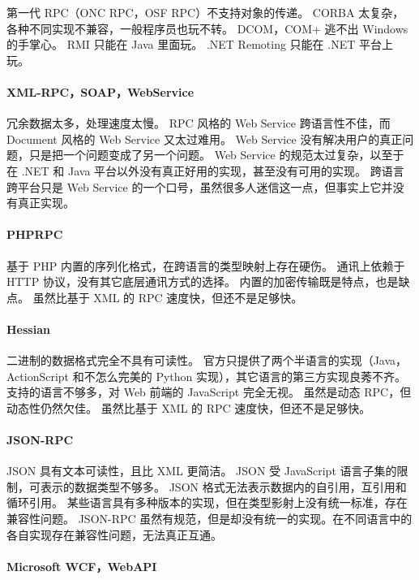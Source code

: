 \documentclass{book}
\begin{document}
第一代 RPC（ONC RPC，OSF RPC）不支持对象的传递。
CORBA 太复杂，各种不同实现不兼容，一般程序员也玩不转。
DCOM，COM+ 逃不出 Windows 的手掌心。
RMI 只能在 Java 里面玩。
.NET Remoting 只能在 .NET 平台上玩。

\paragraph{XML-RPC，SOAP，WebService}

冗余数据太多，处理速度太慢。
RPC 风格的 Web Service 跨语言性不佳，而 Document 风格的 Web Service 又太过难用。
Web Service 没有解决用户的真正问题，只是把一个问题变成了另一个问题。
Web Service 的规范太过复杂，以至于在 .NET 和 Java 平台以外没有真正好用的实现，甚至没有可用的实现。
跨语言跨平台只是 Web Service 的一个口号，虽然很多人迷信这一点，但事实上它并没有真正实现。

\paragraph{PHPRPC}

基于 PHP 内置的序列化格式，在跨语言的类型映射上存在硬伤。
通讯上依赖于 HTTP 协议，没有其它底层通讯方式的选择。
内置的加密传输既是特点，也是缺点。
虽然比基于 XML 的 RPC 速度快，但还不是足够快。

\paragraph{Hessian}

二进制的数据格式完全不具有可读性。
官方只提供了两个半语言的实现（Java，ActionScript 和不怎么完美的 Python 实现），其它语言的第三方实现良莠不齐。
支持的语言不够多，对 Web 前端的 JavaScript 完全无视。
虽然是动态 RPC，但动态性仍然欠佳。
虽然比基于 XML 的 RPC 速度快，但还不是足够快。

\paragraph{JSON-RPC}

JSON 具有文本可读性，且比 XML 更简洁。
JSON 受 JavaScript 语言子集的限制，可表示的数据类型不够多。
JSON 格式无法表示数据内的自引用，互引用和循环引用。
某些语言具有多种版本的实现，但在类型影射上没有统一标准，存在兼容性问题。
JSON-RPC 虽然有规范，但是却没有统一的实现。在不同语言中的各自实现存在兼容性问题，无法真正互通。

\paragraph{Microsoft WCF，WebAPI}
\end{document}
